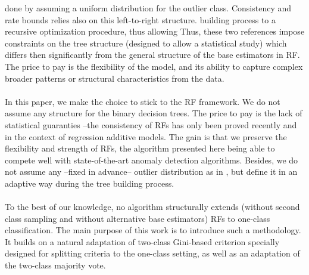 done by assuming a uniform distribution for the outlier class. Consistency and
rate bounds relies also on this left-to-right structure.  %
building process to a recursive optimization procedure, thus allowing
%
%
Thus, these two references \citep{Scott2006, CLEM14} impose constraints on the
tree structure (designed to allow a statistical study) which differs then
significantly from the general structure of the base estimators in \ac{RF}. The
price to pay is the flexibility of the model, and its ability to capture
complex broader patterns or structural characteristics from the data.
\paragraph{} 
In this paper, we make the choice to stick to the \ac{RF} framework. We
do not assume any structure for the binary decision trees. The price to pay is
the lack of statistical guaranties --the consistency of \acp{RF} has only been
proved recently \citep{Scornet2015} and in the context of regression additive
models.  The gain is that we preserve the flexibility and strength of \acp{RF},
the algorithm presented here being able to compete well with state-of-the-art
anomaly detection algorithms. Besides, we do not assume any --fixed in
advance-- outlier distribution as in \citet{CLEM14}, but define it in an
adaptive way during the tree building process.
\paragraph{}
To the best of our knowledge, no algorithm structurally extends (without second
class sampling and without alternative base estimators) \acp{RF} to one-class
classification. %
The main purpose of this work is to introduce such a methodology. It builds on
a natural adaptation of two-class 
Gini-based criterion specially designed for splitting criteria to the one-class
setting, as well as an adaptation of the two-class majority vote.
